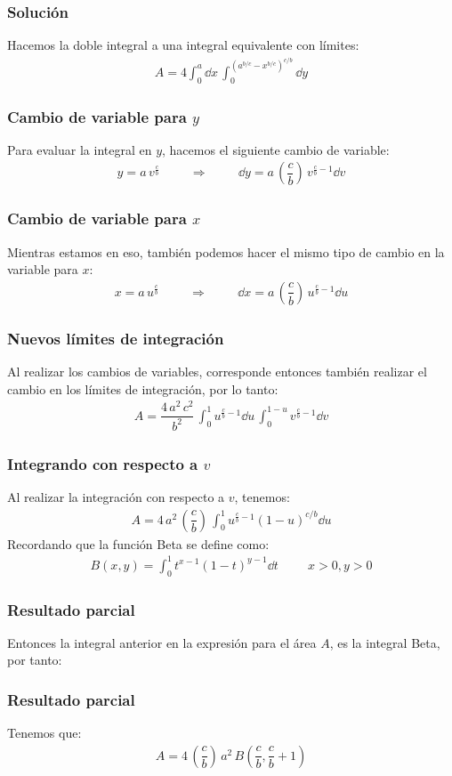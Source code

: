 \begin{frame}
\frametitle{Solución}
Hacemos la doble integral a una integral equivalente con límites:
\begin{align*}
A = 4 \int_{0}^{a} \dd{x} \, \int_{0}^{\left( a^{b/c} - x^{b/c} \right)^{c/b}} \dd{y}
\end{align*}
\end{frame}
\begin{frame}
\frametitle{Cambio de variable para $y$}
Para evaluar la integral en $y$, hacemos el siguiente cambio de variable:
\begin{align*}
y = a \, v^{\frac{c}{b}} \hspace{1cm} \Longrightarrow \hspace{1cm} \dd{y} = a \, \left( \dfrac{c}{b} \right) \, v^{\frac{c}{b} - 1} \dd{v}
\end{align*}
\end{frame}
\begin{frame}
\frametitle{Cambio de variable para $x$}
Mientras estamos en eso, también podemos hacer el mismo tipo de cambio en la variable para $x$:
\begin{align*}
x = a \, u^{\frac{c}{b}} \hspace{1cm} \Longrightarrow \hspace{1cm} \dd{x} = a \, \left( \dfrac{c}{b} \right) \, u^{\frac{c}{b} - 1} \dd{u}
\end{align*}
\end{frame}
\begin{frame}
\frametitle{Nuevos límites de integración}
Al realizar los cambios de variables, corresponde entonces también realizar el cambio en los límites de integración, por lo tanto:
\begin{align*}
A = \dfrac{4 \, a^{2} \, c^{2}}{b^{2}} \, \int_{0}^{1} u^{\frac{c}{b} - 1} \dd{u} \, \int_{0}^{1-u} v^{\frac{c}{b} - 1} \dd{v}
\end{align*}
\end{frame}
\begin{frame}
\frametitle{Integrando con respecto a $v$}
Al realizar la integración con respecto a $v$, tenemos:
\begin{align*}
A = 4 \, a^{2} \, \left( \dfrac{c}{b} \right) \, \int_{0}^{1} u^{\frac{c}{b} - 1} (1 - u)^{c/b} \dd{u}
\end{align*}
\pause
Recordando que la función Beta se define como:
\begin{align*}
B(x, y) = \int_{0}^{1} t^{x-1} (1 - t)^{y-1} \dd{t} \hspace{1cm} x > 0, y > 0
\end{align*}
\end{frame}
\begin{frame}
\frametitle{Resultado parcial}
Entonces la integral anterior en la expresión para el área $A$, es la integral Beta, por tanto:
\end{frame}
\begin{frame}
\frametitle{Resultado parcial}
Tenemos que:
\begin{align*}
A = 4 \, \left( \dfrac{c}{b} \right) \, a^{2} \, B \left( \dfrac{c}{b}, \dfrac{c}{b} + 1 \right)
\end{align*}
\end{frame}
